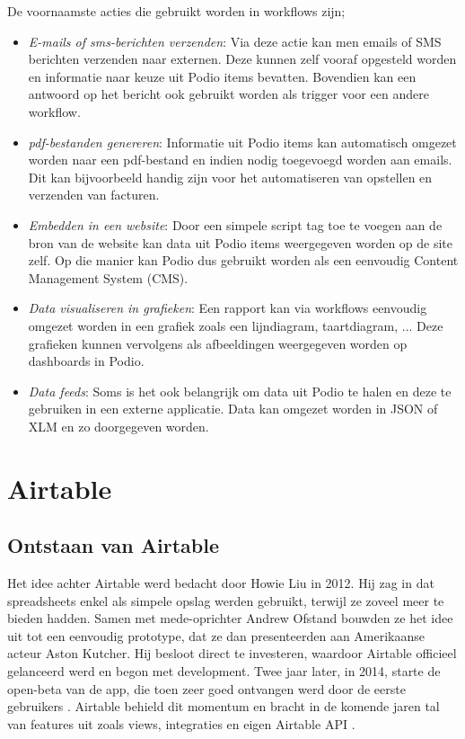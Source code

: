 De voornaamste acties die gebruikt worden in workflows zijn;
\begin{itemize}
    \item \textit{E-mails of sms-berichten verzenden}: Via deze actie kan men emails of SMS berichten verzenden naar externen. Deze kunnen zelf vooraf opgesteld worden en informatie naar keuze uit Podio items bevatten. Bovendien kan een antwoord op het bericht ook gebruikt worden als trigger voor een andere workflow. \autocite{PodioWorkflowFeatures}
    \item \textit{pdf-bestanden genereren}: Informatie uit Podio items kan automatisch omgezet worden naar een pdf-bestand en indien nodig toegevoegd worden aan emails. Dit kan bijvoorbeeld handig zijn voor het automatiseren van opstellen en verzenden van facturen. \autocite{PodioWorkflowFeatures}
    \item \textit{Embedden in een website}: Door een simpele script tag toe te voegen aan de bron van de website kan data uit Podio items weergegeven worden op de site zelf. Op die manier kan Podio dus gebruikt worden als een eenvoudig Content Management System (CMS). \autocite{PodioWorkflowFeatures}
    \item \textit{Data visualiseren in grafieken}: Een rapport kan via workflows eenvoudig omgezet worden in een grafiek zoals een lijndiagram, taartdiagram, ... Deze grafieken kunnen vervolgens als afbeeldingen weergegeven worden op dashboards in Podio. \autocite{PodioWorkflowFeatures}
    \item \textit{Data feeds}: Soms is het ook belangrijk om data uit Podio te halen en deze te gebruiken in een externe applicatie. Data kan omgezet worden in JSON of XLM en zo doorgegeven worden. \autocite{PodioWorkflowFeatures}
\end{itemize}

\section{Airtable}
\label{sec:airtable}


\subsection{Ontstaan van Airtable}
\label{subsec:ontstaan_airtable}


Het idee achter Airtable werd bedacht door Howie Liu in 2012. Hij zag in dat spreadsheets enkel als simpele opslag werden gebruikt, terwijl ze zoveel meer te bieden hadden. Samen met mede-oprichter Andrew Ofstand bouwden ze het idee uit tot een eenvoudig prototype, dat ze dan presenteerden aan Amerikaanse acteur Aston Kutcher. Hij besloot direct te investeren, waardoor Airtable officieel gelanceerd werd en begon met development. Twee jaar later, in 2014, starte de open-beta van de app, die toen zeer goed ontvangen werd door de eerste gebruikers \autocite{Black2019}. Airtable behield dit momentum en bracht in de komende jaren tal van features uit zoals views, integraties en eigen Airtable API \autocite{Shah}. \\


